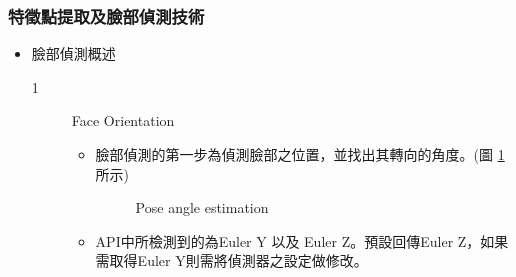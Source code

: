 \documentclass[12pt]{article}  %
\theoremstyle{plain}
\begin{document}
\subsubsection{特徵點提取及臉部偵測技術}
\begin{itemize}
\item 臉部偵測概述
\begin{description}
\item[1] Face Orientation
\begin{itemize}
\item 臉部偵測的第一步為偵測臉部之位置，並找出其轉向的角度。(圖 \ref{Pose angle estimation} 所示)
\begin{figure}[htbp]
\quad
{}
\caption{Pose angle estimation} \label{Pose angle estimation}
\end{figure}
\item API中所檢測到的為Euler Y 以及 Euler Z。預設回傳Euler Z，如果需取得Euler Y則需將偵測器之設定做修改。
\end{itemize}


\end{description}
\end{itemize}
\end{document}

